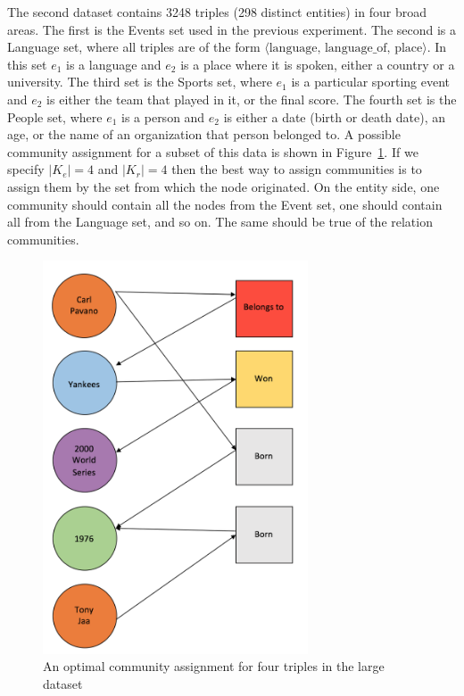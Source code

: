 \documentclass[12pt]{article}
\begin{document}
The second dataset contains 3248 triples (298 distinct entities) in four broad
areas. The first is the Events set used in the previous experiment. The second
is a Language set, where all triples are of the form $\langle \text{language},
\,\text{language\_of}, \,\text{place} \rangle$. In this set $e_1$ is a language and
$e_2$ is a place where it is spoken, either a country or a university. The third
set is the Sports set, where $e_1$ is a particular sporting event and $e_2$ is
either the team that played in it, or the final score. The fourth set is the
People set, where $e_1$ is a person and $e_2$ is either a date (birth or death
date), an age, or the name of an organization that person belonged to. A
possible community assignment for a subset of this data is shown in
Figure~\ref{fig: total}. If we specify $|K_e| = 4$ and $|K_r|=4$ then the best
way to assign communities is to assign them by the set from which the node
originated. On the entity side, one community should contain all the nodes from
the Event set, one should contain all from the Language set, and so on. The same
should be true of the relation communities.

\begin{figure}[t!]
    \centering
    \includegraphics[width=0.7\textwidth,keepaspectratio]{figures/total_dataset_graph.png}
    \caption{An optimal community assignment for four triples in the large dataset}
    \label{fig: total}
\end{figure}
\end{document}
